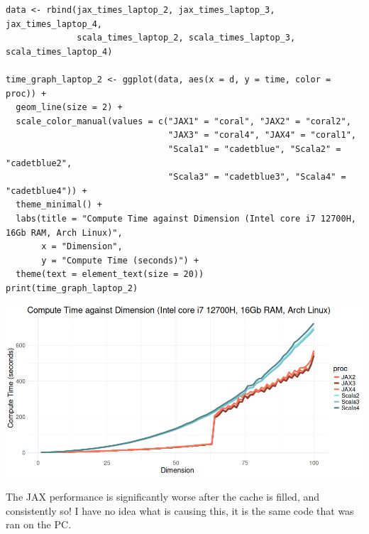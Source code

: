 \documentclass[letterpaper]{article}
\begin{document}
\begin{verbatim}
data <- rbind(jax_times_laptop_2, jax_times_laptop_3, jax_times_laptop_4,
              scala_times_laptop_2, scala_times_laptop_3, scala_times_laptop_4)

time_graph_laptop_2 <- ggplot(data, aes(x = d, y = time, color = proc)) +
  geom_line(size = 2) +
  scale_color_manual(values = c("JAX1" = "coral", "JAX2" = "coral2",
                                "JAX3" = "coral4", "JAX4" = "coral1",
                                "Scala1" = "cadetblue", "Scala2" = "cadetblue2",
                                "Scala3" = "cadetblue3", "Scala4" = "cadetblue4")) +
  theme_minimal() + 
  labs(title = "Compute Time against Dimension (Intel core i7 12700H, 16Gb RAM, Arch Linux)",
       x = "Dimension",
       y = "Compute Time (seconds)") +
  theme(text = element_text(size = 20))
print(time_graph_laptop_2)
\end{verbatim}

\begin{center}
\includegraphics[width=.9\linewidth]{./Figures/plot_complexity_laptop_2.png}
\label{org12a8ec8}
\end{center}

The JAX performance is significantly worse after the cache is filled, and consistently so! I have no idea what is causing this, it is the same code that was ran on the PC.
\end{document}
